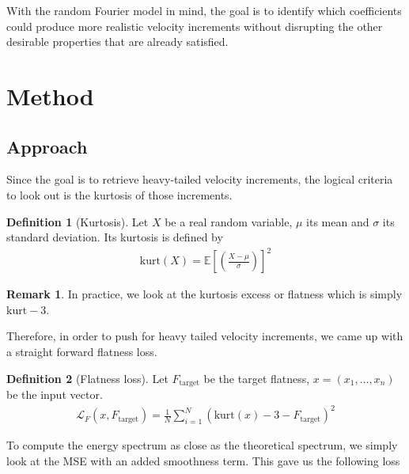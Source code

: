 \documentclass[a4paper,12pt]{article}
\theoremstyle{definition}
\newtheorem{definition}{Definition}
\newtheorem{remark}{Remark}
\begin{document}
\bigskip
With the random Fourier model in mind, the goal is to identify which coefficients could produce more realistic velocity increments without disrupting the other desirable properties that are already satisfied. 

\section{Method} \label{Method}

\subsection{Approach}

Since the goal is to retrieve heavy-tailed velocity increments, the logical criteria to look out is the kurtosis of those increments. 


\begin{definition}[Kurtosis]
    Let $X$ be a real random variable, $\mu$ its mean and $\sigma$ its standard deviation. Its kurtosis is defined by 
    \begin{align}
    \text{kurt}(X)=\mathbb{E}\left[\left(\frac{X-\mu}{\sigma}\right) \right]^2    
    \end{align}
\end{definition}


\begin{remark}
    In practice, we look at the kurtosis excess or flatness which is simply $\text{kurt}-3$.
\end{remark}
Therefore, in order to push for heavy tailed velocity increments, we came up with a straight forward flatness loss. 

\begin{definition}[Flatness loss]
    Let $F_\text{target}$ be the target flatness, $x=(x_1,\ldots,x_n)$ be the input vector.
    \begin{align}
        \mathcal{L}_F (x, F_\text{target}) = \frac{1}{N}\sum_{i=1}^{N}\left( \text{kurt}(x)-3 - F_\text{target}  \right) ^2 
    \end{align}
\end{definition}

To compute the energy spectrum as close as the theoretical spectrum, we simply look at the MSE with an added smoothness term. This gave us the following loss
\end{document}
